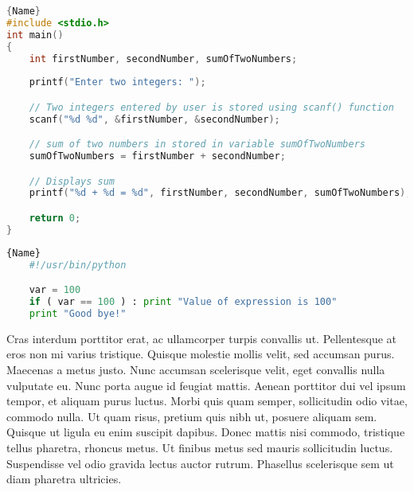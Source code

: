 \noindent\begin{minipage}{.45\textwidth}
	\begin{lstlisting}[caption=comparativa 1,style=colorBB, style=no-color-line, language=C]{Name}
#include <stdio.h>
int main()
{
    int firstNumber, secondNumber, sumOfTwoNumbers;
    
    printf("Enter two integers: ");

    // Two integers entered by user is stored using scanf() function
    scanf("%d %d", &firstNumber, &secondNumber);

    // sum of two numbers in stored in variable sumOfTwoNumbers
    sumOfTwoNumbers = firstNumber + secondNumber;

    // Displays sum      
    printf("%d + %d = %d", firstNumber, secondNumber, sumOfTwoNumbers);

    return 0;
}	\end{lstlisting}
\end{minipage}\hfill
\begin{minipage}{.45\textwidth}
	\begin{lstlisting}[caption=comparativa 2,style=colorBB, style=no-color-line, language=Python]{Name}
	#!/usr/bin/python

	var = 100
	if ( var == 100 ) : print "Value of expression is 100"
	print "Good bye!"
	\end{lstlisting}
\end{minipage}

Cras interdum porttitor erat, ac ullamcorper turpis convallis ut. Pellentesque at eros non mi varius tristique. Quisque molestie mollis velit, sed accumsan purus. Maecenas a metus justo. Nunc accumsan scelerisque velit, eget convallis nulla vulputate eu. Nunc porta augue id feugiat mattis. Aenean porttitor dui vel ipsum tempor, et aliquam purus luctus. Morbi quis quam semper, sollicitudin odio vitae, commodo nulla. Ut quam risus, pretium quis nibh ut, posuere aliquam sem. Quisque ut ligula eu enim suscipit dapibus. Donec mattis nisi commodo, tristique tellus pharetra, rhoncus metus. Ut finibus metus sed mauris sollicitudin luctus. Suspendisse vel odio gravida lectus auctor rutrum. Phasellus scelerisque sem ut diam pharetra ultricies.


